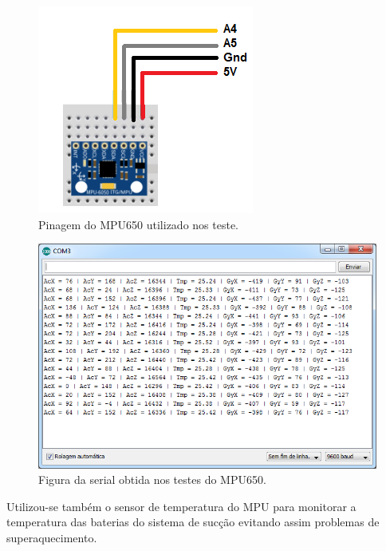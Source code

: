 \begin{itemize}
			\begin{figure}[h!]
			    \centering
			    \includegraphics[keepaspectratio=true,scale=1]{figuras/imu.png}
			    \centering
			    \caption{Pinagem do MPU650 utilizado nos teste.}
			    \label{imu}
			\end{figure}


			\begin{figure}[h!]
			    \centering
			    \includegraphics[keepaspectratio=true,scale=0.7]{figuras/serial.png}
			    \centering
			    \caption{Figura da serial obtida nos testes do MPU650.}
			    \label{serial}
			\end{figure}

			Utilizou-se também o sensor de temperatura do MPU para monitorar a temperatura das baterias do sistema de sucção evitando assim problemas de superaquecimento.


	\end{itemize}

